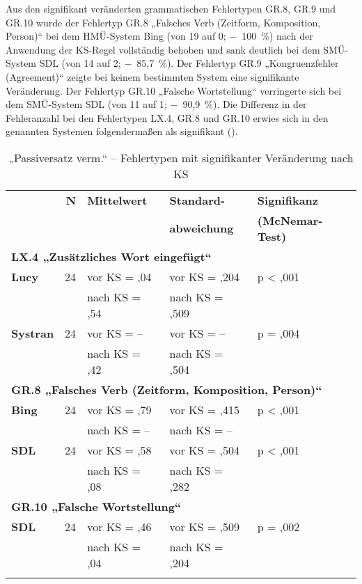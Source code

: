 Aus den signifikant veränderten grammatischen Fehlertypen GR.8, GR.9 und GR.10 wurde der Fehlertyp GR.8 „Falsches Verb (Zeitform, Komposition, Person)“ bei dem HMÜ-System Bing (von 19 auf 0; $-$~100~\%) nach der Anwendung der KS-Regel vollständig behoben und sank deutlich bei dem SMÜ-System SDL (von 14 auf 2; $-$~85,7~\%). Der Fehlertyp GR.9 „Kongruenzfehler (Agreement)“ zeigte bei keinem bestimmten System eine signifikante Veränderung. Der Fehlertyp GR.10 „Falsche Wortstellung“ verringerte sich bei dem SMÜ-System SDL (von 11 auf 1; $-$~90,9~\%). Die Differenz in der Fehleranzahl bei den Fehlertypen LX.4, GR.8 und GR.10 erwies sich in den genannten Systemen folgendermaßen als signifikant ().


\begin{table}
\begin{tabularx}{.86\textwidth}{lrlll}

\lsptoprule

{} & { \textbf{N}} & { \textbf{Mittelwert}} & { \textbf{Standard-}} & { \textbf{Signifikanz}}\\
& & & \textbf{abweichung} & \textbf{(McNemar-Test)}\\
\midrule
\multicolumn{5}{l}{\textbf{LX.4 „Zusätzliches Wort eingefügt“}}\\
{ \textbf{Lucy}} & { 24} & vor KS = ,04 & vor KS = ,204 & p < ,001\\
& & nach KS = ,54 & nach KS = ,509 & \\
{ \textbf{Systran}} & { 24} & vor KS = -- & vor KS = -- & p = ,004\\
& & nach KS = ,42 & {nach KS = ,504} & \\
\midrule
\multicolumn{5}{l}{\textbf{GR.8 „Falsches Verb (Zeitform, Komposition, Person)“}}\\
{ \textbf{Bing}} & { 24} & vor KS = ,79 & vor KS = ,415 & p < ,001\\
& & nach KS = -- & {nach KS = --} & \\
{ \textbf{SDL}} & { 24} & vor KS = ,58 & vor KS = ,504 & p < ,001\\
& & nach KS = ,08 & {nach KS = ,282} & \\
\midrule
\multicolumn{5}{l}{\textbf{GR.10 „Falsche Wortstellung“}}\\
{ \textbf{SDL}} & { 24} & vor KS = ,46 & vor KS = ,509 & p = ,002\\
& & nach KS = ,04 & {nach KS = ,204} & \\
\lspbottomrule
\end{tabularx}
\caption{\label{tab:05:68} „Passiversatz verm.“ -- Fehlertypen mit signifikanter Veränderung nach KS  }
\end{table}

